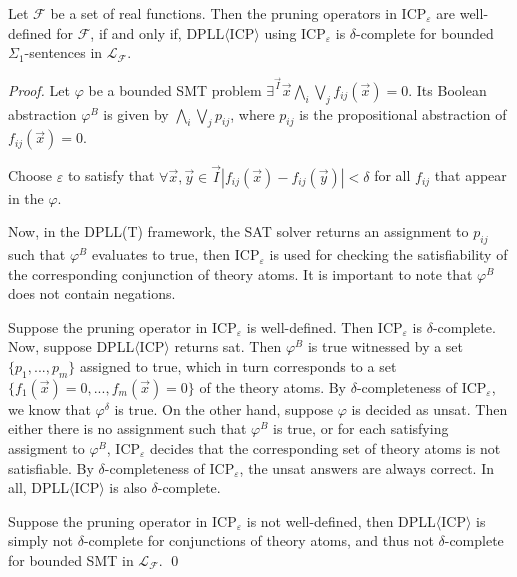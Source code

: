 \documentclass[prodmode]{acmsmall} %
\begin{document}
\begin{corollary}
Let $\mathcal{F}$ be a set of real functions. Then the pruning operators in ICP$_{\varepsilon}$ are well-defined for $\mathcal{F}$, if and only if, DPLL$\langle$ICP$\rangle$ using ICP$_{\varepsilon}$ is $\delta$-complete for bounded $\Sigma_1$-sentences in $\mathcal{L}_{\mathcal{F}}$.
\end{corollary}

\begin{proof}
Let $\varphi$ be a bounded SMT problem $\exists^{\vec I}\vec x \bigwedge_i\bigvee_j f_{ij}(\vec x)=0.$
Its Boolean abstraction $\varphi^B$ is given by $\bigwedge_i\bigvee_j p_{ij}$, where $p_{ij}$ is the propositional abstraction of $f_{ij}(\vec x)=0$. 

Choose $\varepsilon$ to satisfy that $\forall \vec x, \vec y\in \vec I |f_{ij}(\vec x)-f_{ij}(\vec y)|<\delta$ for all $f_{ij}$ that appear in the $\varphi$.

Now, in the DPLL(T) framework, the SAT solver returns an assignment to $p_{ij}$ such that $\varphi^B$ evaluates to true, then ICP$_{\varepsilon}$ is used for checking the satisfiability of the corresponding conjunction of theory atoms. It is important to note that $\varphi^B$ does not contain negations. 

Suppose the pruning operator in ICP$_{\varepsilon}$ is well-defined. Then ICP$_{\varepsilon}$ is $\delta$-complete. Now, suppose DPLL$\langle$ICP$\rangle$ returns {\sf sat}. Then $\varphi^B$ is true witnessed by a set $\{p_1,...,p_m\}$ assigned to true, which in turn corresponds to a set $\{f_1(\vec x)=0,...,f_m(\vec x)=0\}$ of the theory atoms. By $\delta$-completeness of ICP$_{\varepsilon}$, we know that $\varphi^{\delta}$ is true. On the other hand, suppose $\varphi$ is decided as {\sf unsat}. Then either there is no assignment such that $\varphi^B$ is true, or for each satisfying assigment to $\varphi^B$, ICP$_{\varepsilon}$ decides that the corresponding set of theory atoms is not satisfiable. By $\delta$-completeness of ICP$_{\varepsilon}$, the {\sf unsat} answers are always correct. In all, DPLL$\langle$ICP$\rangle$ is also $\delta$-complete. 

Suppose the pruning operator in ICP$_{\varepsilon}$ is not well-defined, then DPLL$\langle$ICP$\rangle$ is simply not $\delta$-complete for conjunctions of theory atoms, and thus not $\delta$-complete for bounded SMT in $\mathcal{L}_{\mathcal{F}}$. 
\qed\end{proof}
\end{document}

